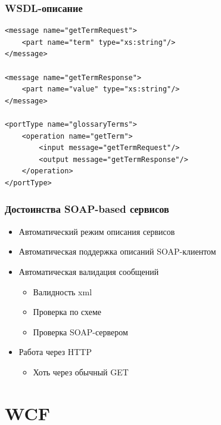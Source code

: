 \documentclass[xetex,mathserif,serif]{beamer}
\begin{document}
	\begin{frame}[fragile]
		\frametitle{WSDL-описание}
		\begin{small}
			\begin{verbatim}
<message name="getTermRequest">
    <part name="term" type="xs:string"/>
</message>

<message name="getTermResponse">
    <part name="value" type="xs:string"/>
</message>

<portType name="glossaryTerms">
    <operation name="getTerm">
        <input message="getTermRequest"/>
        <output message="getTermResponse"/>
    </operation>
</portType>
			\end{verbatim}
		\end{small}
	\end{frame}

	\begin{frame}
		\frametitle{Достоинства SOAP-based сервисов}
		\begin{itemize}
			\item Автоматический режим описания сервисов
			\item Автоматическая поддержка описаний SOAP-клиентом
			\item Автоматическая валидация сообщений
			\begin{itemize}
				\item Валидность xml
				\item Проверка по схеме
				\item Проверка SOAP-сервером
			\end{itemize}
			\item Работа через HTTP
			\begin{itemize}
				\item Хоть через обычный GET
			\end{itemize}
		\end{itemize}
	\end{frame}

	\section{WCF}
\end{document}
